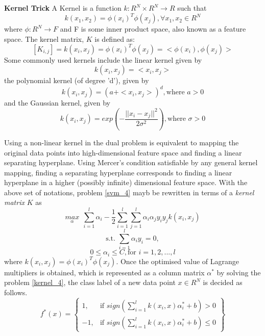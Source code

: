 \documentclass[12pt,a4paper,oneside,english]{report}
\begin{document}
\textbf{Kernel Trick}
A Kernel is a function $k: R^N \times R^N \to R$ such that \\
\[k(x_1,x_2) = \phi(x_i)^T\phi(x_j), \forall x_1,x_2 \in R^N\]
where $\phi: R^N \to F$ and F is some inner product space, also known as a feature space. The kernel matrix, $K$ is defined as:
\[ [K_{i,j}]  = k(x_i,x_j) = \phi(x_i)^T\phi(x_j) = <\phi(x_i),\phi(x_j)>\]
Some commonly used kernels include the linear kernel given by
\begin{equation} \label{kernel_1}
    k(x_i,x_j) = <x_i,x_j>
\end{equation}
the polynomial kernel (of degree 'd'), given by
\begin{equation} \label{kernel_2}
    k(x_i,x_j) = (a+<x_i,x_j>)^d, \text{where } a>0
\end{equation}
and the Gaussian kernel, given by
\begin{equation} \label{kernel_3}
    k(x_i,x_j) = exp\left(-\frac{||x_i-x_j||^2}{2\sigma^2}\right), \text{where }\sigma>0
\end{equation}


 Using a non-linear kernel in the dual problem is equivalent to mapping the original data points into high-dimensional feature space and finding a linear separating hyperplane. Using Mercer's condition satisfiable by any general kernel mapping, finding a separating hyperplane corresponds to finding a linear hyperplane in a higher (possibly infinite) dimensional feature space.
With the above set of notations, problem \ref{svm_4} mayb be rewritten in terms of a \textit{kernel matrix} $K$ as
\begin{equation} \label{kernel_4}
\underset {\alpha}{max} \ \ \sum_{i=1}^{l}\alpha_i - \frac{1}{2} \sum_{i=1}^{l} \sum_{j=1}^{l} \alpha_i \alpha_j y_i y_j k(x_i,x_j)
\end{equation}
\[\text{s.t. } \sum_{i=1}^l \alpha_i y_i = 0, \]
\[0 \leq \alpha_i \leq C, \text{for } i = 1,2,...,l\]
where $k(x_i,x_j) = \phi(x_i)^T\phi(x_j).$
Once the optimised value of Lagrange multipliers is obtained, which is represented as a column matrix $\alpha^*$ by solving the problem \ref{kernel_4}, the class label of a new data point $x \in R^N$ is decided as follows.
\begin{equation}
    f^*(x) = \left\{
    \begin{array}{lr}
        1, & \text{if } sign\left(\sum_{i=1}^l k(x_i,x)\alpha^*_i +b\right)>0 \\
        -1, & \text{if } sign\left(\sum_{i=1}^l k(x_i,x)\alpha^*_i +b\right)\leq 0
    \end{array}
    \right\}
\end{equation}
\end{document}
